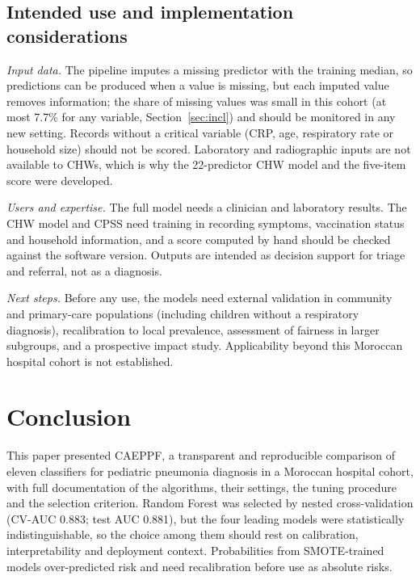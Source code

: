\documentclass[a4paper,fleqn]{cas-dc}
\begin{document}
\subsection{Intended use and implementation considerations}
\label{sec:use}

\textit{Input data.} The pipeline imputes a missing predictor with the training median, so predictions can be produced when a value is missing, but each imputed value removes information; the share of missing values was small in this cohort (at most 7.7\% for any variable, Section~\ref{sec:incl}) and should be monitored in any new setting. Records without a critical variable (CRP, age, respiratory rate or household size) should not be scored. Laboratory and radiographic inputs are not available to CHWs, which is why the 22-predictor CHW model and the five-item score were developed.

\textit{Users and expertise.} The full model needs a clinician and laboratory results. The CHW model and CPSS need training in recording symptoms, vaccination status and household information, and a score computed by hand should be checked against the software version. Outputs are intended as decision support for triage and referral, not as a diagnosis.

\textit{Next steps.} Before any use, the models need external validation in community and primary-care populations (including children without a respiratory diagnosis), recalibration to local prevalence, assessment of fairness in larger subgroups, and a prospective impact study. Applicability beyond this Moroccan hospital cohort is not established.

\section{Conclusion}
\label{sec:conc}

This paper presented CAEPPF, a transparent and reproducible comparison of eleven classifiers for pediatric pneumonia diagnosis in a Moroccan hospital cohort, with full documentation of the algorithms, their settings, the tuning procedure and the selection criterion. Random Forest was selected by nested cross-validation (CV-AUC 0.883; test AUC 0.881), but the four leading models were statistically indistinguishable, so the choice among them should rest on calibration, interpretability and deployment context. Probabilities from SMOTE-trained models over-predicted risk and need recalibration before use as absolute risks.
\end{document}
